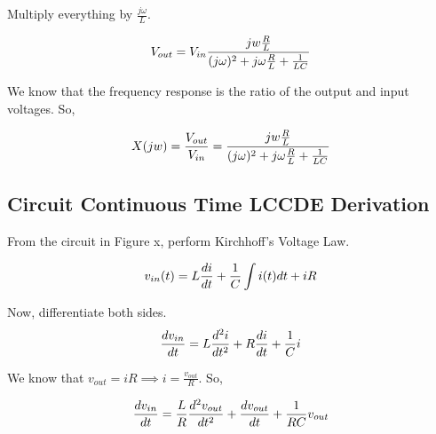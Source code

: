 \documentclass[conference]{IEEEtran}
\begin{document}
Multiply everything by $\frac{j\omega}{L}$.

\begin{equation}
    \large
     V_{out} = V_{in}\frac{jw\frac{R}{L}}{(j\omega)^2 + j\omega \frac{R}{L} + \frac{1}{L C}}
\end{equation}

We know that the frequency response is the ratio of the output and input voltages. So,

\begin{equation}
    \large
    X(jw) = \frac{V_{out}}{V_{in}} = \frac{jw\frac{R}{L}}{(j\omega)^2 + j\omega \frac{R}{L} + \frac{1}{L C}}
\end{equation}

\subsection{Circuit Continuous Time LCCDE Derivation}
From the circuit in Figure x, perform Kirchhoff's Voltage Law.

\begin{equation}
    \large
    v_{in}(t)= L\frac{di}{dt} +  \frac{1}{C}\int i(t) dt +  iR
\end{equation}

Now, differentiate both sides.
\begin{equation}
    \large
    \frac{dv_{in}}{dt} = L\frac{d^2i}{dt^2} + R\frac{di}{dt} + \frac{1}{C}i 
\end{equation}

We know that $v_{out}=iR \implies i = \frac{v_{out}}{R}$. So,

\begin{equation}
    \large
    \frac{dv_{in}}{dt} = \frac{L}{R}\frac{d^2v_{out}}{dt^2} + \frac{dv_{out}}{dt} + \frac{1}{RC}v_{out} 
\end{equation}
\newpage
\end{document}
